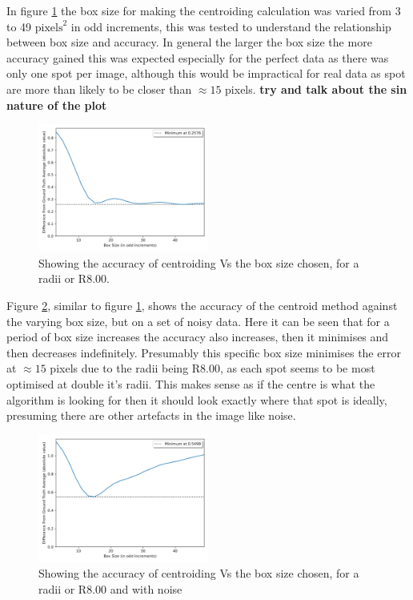 \documentclass[aps,pra,a4paper,nofootinbib,onecolumn,tightenlines,longbibliography,12pt,amsfonts,amssymb,amsmath,floatfix]{revtex4-2} %
\begin{document}
  In figure \ref{fig:box_var_r8} the box size for making the centroiding calculation 
  was varied from 3 to 49 $\textrm{pixels}^2$ in odd increments, this was tested to understand the 
  relationship between box size and accuracy. In general the larger the box size the more accuracy 
  gained this was expected especially for the perfect data as there was only one spot per image, 
  although this would be impractical for real data as spot are more than likely to be closer than 
  $\approx 15$ pixels. \textbf{try and talk about the sin nature of the plot}


  \begin{figure}[H]
    \begin{center}
      \includegraphics[width=0.5\textwidth]{project_pics/box_size_var_r8.png}
    \end{center}
    \caption{Showing the accuracy of centroiding Vs the box size chosen, for a radii or R8.00.}
    \label{fig:box_var_r8}
  \end{figure}

  Figure \ref{fig:noise_box_r8}, similar to figure \ref{fig:box_var_r8}, shows the accuracy of the 
  centroid method against the varying box size, but on a set of noisy data. Here it can be seen that 
  for a period of box size increases the accuracy also increases, then it minimises and then decreases indefinitely.
  Presumably this specific box size minimises the error at $\approx 15$ pixels due to the radii being R8.00, 
  as each spot seems to be most optimised at double it's radii. This makes sense as if the centre is 
  what the algorithm is looking for then it should look exactly where that spot is ideally, presuming 
  there are other artefacts in the image like noise. 

  \begin{figure}[H]
    \begin{center}
      \includegraphics[width=0.5\textwidth]{project_pics/box_size_var_noise_r8.png}
    \end{center}
    \caption{Showing the accuracy of centroiding Vs the box size chosen, for a radii or R8.00 and with noise}
    \label{fig:noise_box_r8}
  \end{figure}
\end{document}
